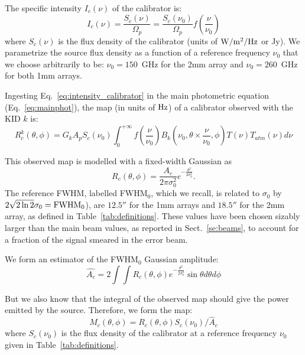 The specific intensity $I_{c}(\nu)$ of the
calibrator is:
\begin{equation}
I_{c}(\nu) =  \frac{S_{c}(\nu)}{\Omega_{p}} =\frac{ S_{c}
  (\nu_{0})}{\Omega_{p}} f(\frac{\nu}{\nu_{0}})
\label{eq:intensity_calibrator}
\end{equation}
where $S_{c}(\nu)$ is the flux density of the calibrator (units
of $\rm W/m^{2}/Hz$ or Jy). We parametrize the source flux density
as a function of a reference frequency $\nu_{0}$ that we choose
arbitrarily to be: $\nu_{0} = 150$~GHz for the 2mm array and $\nu_{0}
= 260$~GHz for both 1mm arrays. 

Ingesting Eq.~\ref{eq:intensity_calibrator} in the main photometric
equation (Eq.~\ref{eq:mainphot}), the map (in units of $\rm Hz$) of a
calibrator observed with the KID $k$ is:
\begin{equation}
R_{c}^{k}(\theta, \phi) =  G_{k} A_{p} S_{c} (\nu_{0})  \int_{0}^{+\infty}
f(\frac{\nu}{\nu_{0}}) B_{k}(\nu_{0}, \theta \times \frac{\nu}{\nu_{0}},
\phi) T(\nu) T_{atm}(\nu) d\nu
\label{eq:mainbeammap}
\end{equation}

This observed map is modelled with a fixed-width Gaussian as 
\begin{equation} 
R_{c}(\theta, \phi)  = \frac{A_{c}}{2 \pi \sigma_{0}^{2}}
e^{-\frac{\theta^{2}}{2\sigma_{0}^{2}}}. 
\end{equation}
The reference FWHM, labelled FWHM$_{0}$, which we recall, is related
to $\sigma_{0}$ by $2 \sqrt{2\ln{2}} \sigma_{0} = {\rm FWHM}_{0}$),
are $12.5''$ for the 1mm arrays and $18.5''$ for the 2mm
array, as defined in Table~\ref{tab:definitions}. These values have
been chosen sizably larger than the main beam values, as reported in
Sect.~\ref{se:beams}, to account for a fraction of the signal smeared 
in the error beam.


We form an estimator of the FWHM$_{0}$ Gaussian amplitude:
\begin{equation} 
\hat{A_{c}}  = 2 \int \int R_{c}(\theta, \phi) e^{-\frac{\theta^{2}}{2\sigma_{0}^{2}}} \sin \theta d\theta d\phi
\end{equation}

But we also know that the integral of the observed map should give the power
emitted by the source. Therefore, we form the map:
\begin{equation}
M_{c}(\theta, \phi) = R_{c}(\theta, \phi)   S_{c} (\nu_{0}) / \hat{A}_{c}
\end{equation}
where  $S_{c} (\nu_{0})$ is the flux density of the calibrator
at a reference frequency $\nu_{0}$ given in Table~\ref{tab:definitions}.

